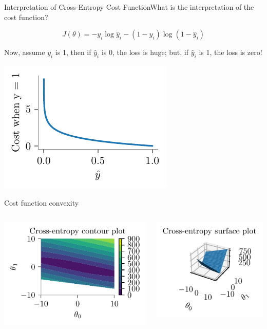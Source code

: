 \documentclass{beamer}
\begin{document}
\begin{frame}{Interpretation of Cross-Entropy Cost Function}\pause What is the interpretation of the cost function?



 $$J(\theta) = -y_i\log{\hat{y}_i} - (1-y_i)\log({1-\hat{y}_i})$$

\pause Now, assume $y_i$ is 1, then if $\hat{y}_i$ is 0, the loss is huge; but, if $\hat{y}_i$ is 1, the loss is zero!

\includegraphics[scale=0.7]{../assets/logistic-regression/figures/logistic-cross-cost-1}


\end{frame}

\begin{frame}{Cost function convexity}
\begin{columns}
	\begin{column}{0.5\textwidth}
		\includegraphics[scale=0.7]{../assets/logistic-regression/figures/logistic-cross-loss-contour.pdf}
	\end{column}
	\begin{column}{0.5\textwidth}
		\includegraphics[scale=0.7]{../assets/logistic-regression/figures/logistic-cross-loss-surface.pdf}
	\end{column}
\end{columns}
\end{frame}
\end{document}
